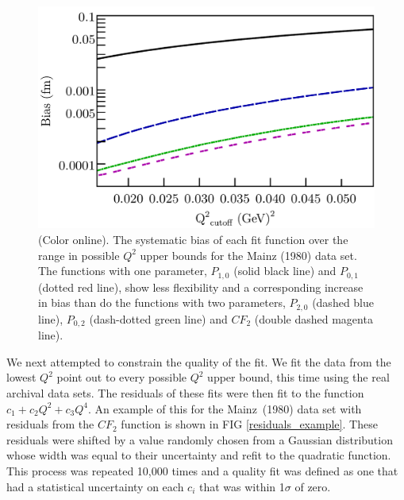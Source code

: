 \documentclass[aps,prd,twocolumn,groupedaddress,10pt]{revtex4-1}
\begin{document}
\begin{figure}[h!]
	\includegraphics[scale=0.39]{bias_example.pdf}
	\caption{(Color online). The systematic bias of each fit function over the range in possible $Q^2$ upper bounds for the Mainz (1980) data set. The functions with one parameter, $P_{1,0}$ (solid black line) and $P_{0,1}$ (dotted red line), show less flexibility and a corresponding increase in bias than do the functions with two parameters, $P_{2,0}$ (dashed blue line), $P_{0,2}$ (dash-dotted green line) and ${CF}_2$ (double dashed magenta line).}
	\label{systematic_bias}
\end{figure}

We next attempted to constrain the quality of the fit. We fit the data from the lowest $Q^2$ point out to every possible $Q^2$ upper bound, this time using the real archival data sets. The residuals of these fits were then fit to the function $c_1 + c_2 Q^2 + c_3 Q^4$. An example of this for the Mainz~(1980) data set with residuals from the ${CF}_{2}$ function is shown in FIG \ref{residuals_example}. These residuals were shifted by a value randomly chosen from a Gaussian distribution whose width was equal to their uncertainty and refit to the quadratic function. This process was repeated 10,000 times and a quality fit was defined as one that had a statistical uncertainty on each $c_i$ that was within 1$\sigma$ of zero. 
\end{document}
